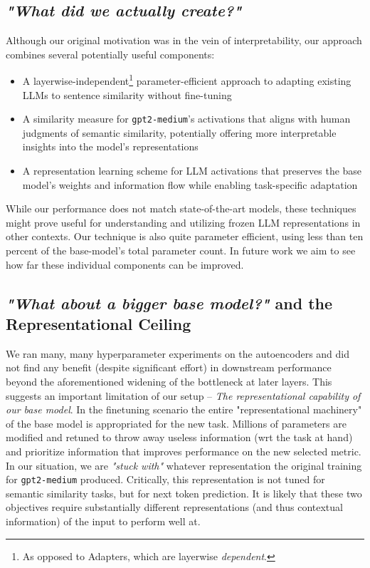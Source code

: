 \documentclass{article}
\begin{document}
\subsection{\textit{"What did we actually create?"}} \label{pathways}
Although our original motivation was in the vein of interpretability, our approach combines several potentially useful components:
\begin{itemize}
    \item A layerwise-independent\footnote{As opposed to Adapters, which are layerwise \textit{dependent}.} parameter-efficient approach to adapting existing LLMs to sentence similarity without fine-tuning
    \item A similarity measure for \verb|gpt2-medium|'s activations that aligns with human judgments of semantic similarity, potentially offering more interpretable insights into the model's representations
    \item A representation learning scheme for LLM activations that preserves the base model's weights and information flow while enabling task-specific adaptation
\end{itemize}
While our performance does not match state-of-the-art models, these techniques might prove useful for understanding and utilizing frozen LLM representations in other contexts. Our technique is also quite parameter efficient, using less than ten percent of the base-model's total parameter count. In future work we aim to see how far these individual components can be improved. 

\subsection{\textit{"What about a bigger base model?"} and the Representational Ceiling}
We ran many, many hyperparameter experiments on the autoencoders and did not find any benefit (despite significant effort) in downstream performance beyond the aforementioned widening of the bottleneck at later layers. This suggests an important limitation of our setup -- \textit{The representational capability of our base model}. In the finetuning scenario the entire "representational machinery" of the base model is appropriated for the new task. Millions of parameters are modified and retuned to throw away useless information (wrt the task at hand) and prioritize information that improves performance on the new selected metric. In our situation, we are \textit{"stuck with"} whatever representation the original training for \verb|gpt2-medium| produced. Critically, this representation is not tuned for semantic similarity tasks, but for next token prediction. It is likely that these two objectives require substantially different representations (and thus contextual information) of the input to perform well at.
\end{document}

